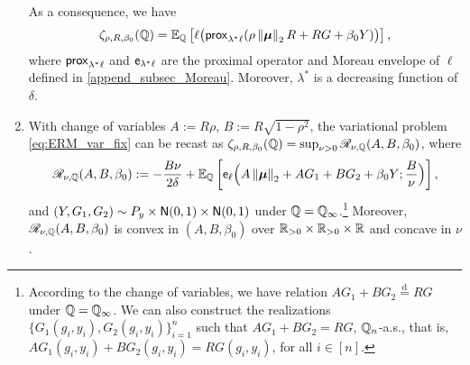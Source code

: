 \begin{lem}
\begin{enumerate}[label=(\alph*)]
        As a consequence, we have
        \begin{equation*}
            \zeta_{\rho, R, \beta_0}(\mathbb{Q})
                = 
            \mathbb{E}_{\mathbb{Q}} \left[ \ell \bigl( \mathsf{prox}_{ \lambda^* \ell}( \rho \left\|{{\boldsymbol{\mu}}}\right\|_2 R + R G + \beta_0 Y )
                \bigr) \right],
        \end{equation*}
        where $\mathsf{prox}_{\lambda^*\ell}$ and $\mathsf{e}_{\lambda^*\ell}$ are the proximal operator and Moreau envelope of $\ell$ defined in \cref{append_subsec_Moreau}. Moreover, $\lambda^*$ is a decreasing function of $\delta$.
        \item \label{lem:var_fixed(b)}
        With change of variables $A := R \rho$, $B := R \sqrt{1 - \rho^2}$, the variational problem \cref{eq:ERM_var_fix} can be recast as $\zeta_{\rho, R, \beta_0}(\mathbb{Q}) = \sup_{\nu > 0} \mathscr{R}_{\nu, \mathbb{Q}}(A, B, \beta_0)$, where
        \begin{equation*}
            \mathscr{R}_{\nu, \mathbb{Q}}(A, B, \beta_0) 
            :=   - \frac{B \nu}{2 \delta }
            +
            \mathbb{E}_{\mathbb{Q}} \left[ \mathsf{e}_{\ell} \Bigl( A \left\|{{\boldsymbol{\mu}}}\right\|_2 + A G_1 + B G_2 + \beta_0 Y ; \frac{B}{\nu} \Bigr) \right], 
        \end{equation*}
        and $(Y, G_1, G_2) \sim P_y \times {\sf N}(0, 1) \times {\sf N}(0, 1)$ under $\mathbb{Q} = \mathbb{Q}_\infty$.\footnote{According to the change of variables, we have relation $A G_1 + B G_2 \overset{\mathrm{d}}{=} R G$ under $\mathbb{Q} = \mathbb{Q}_\infty$. We can also construct the realizations $\{G_1(g_i, y_i), G_2(g_i, y_i)\}_{i=1}^n$ such that $A G_1 + B G_2 = R G$, $\mathbb{Q}_n$-a.s., that is, $A G_1(g_i, y_i) + B G_2(g_i, y_i) = R G(g_i, y_i)$, for all $i \in [n]$.} Moreover, $\mathscr{R}_{\nu, \mathbb{Q}}(A, B, \beta_0)$ is convex in $(A, B, \beta_0)$ over $\mathbb{R}_{>0} \times \mathbb{R}_{>0} \times \mathbb{R}$ and concave in $\nu$.
        
    \end{enumerate}
\end{lem}
